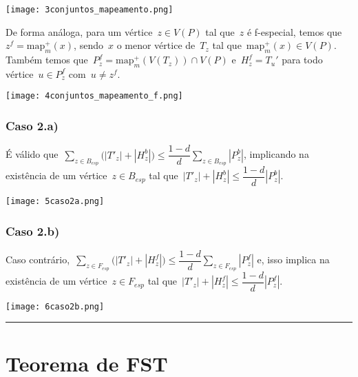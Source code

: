 \documentclass[a0,portrait]{a0poster}
\newcommand{\map}{\mathrm{map}}
\begin{document}
\begin{multicols}{3}
    \begin{center}
\texttt{[image: 3conjuntos\_mapeamento.png]}
\end{center}

    \bigskip
    \bigskip

    De forma análoga, para um vértice~${z\in V(P)}$ tal 
    que~$z$ é f-especial,
    temos que~${z^f = \map^+_m(x)}$,
    sendo~$x$ o menor vértice de~$T_z$ tal 
    que~${\map^+_m(x)\in V(P)}$.
    Também temos
    que~${P_z^f = \map^+_m(V(T_z))\cap V(P)}$
    e~${H_z^f =T_u'}$ para todo 
    vértice~${u\in P_z^f}$ com~${u\ne z^f}$.

\begin{center}
    \texttt{[image: 4conjuntos\_mapeamento\_f.png]}
\end{center}
    \subsubsection*{Caso 2.a)}
        É válido que~${\displaystyle\sum_{z\in B_{esp}}
        \Big(|T'_{z}|+|H_z^b|\Big)\le
        \dfrac{1-d}{d}\displaystyle\sum_{z\in B_{esp}}|P_z^b|}$,
        implicando na existência de um vértice~${z\in B_{esp}}$ 
        tal que~${|T'_{z}|+|H_z^b|\le
        \dfrac{1-d}{d}|P_z^b|}$.

\begin{center}
    \texttt{[image: 5caso2a.png]}
\end{center}
    \subsubsection*{Caso 2.b)}
        Caso contrário,~${\displaystyle\sum_{z\in F_{esp}}
        \Big(|T'_{z}|+|H_z^f|\Big)\le
        \dfrac{1-d}{d}\displaystyle\sum_{z\in F_{esp}}|P_z^f|}$
        e, isso implica na existência de um vértice~${z\in F_{esp}}$ 
        tal 
        que~${|T'_{z}|+|H_z^f|\le
        \dfrac{1-d}{d}|P_z^f|}$.

\begin{center}
\texttt{[image: 6caso2b.png]}
\end{center}
\noindent\rule[0.5ex]{\linewidth}{1pt}

\section*{Teorema de FST}


\end{multicols}
\end{document}
